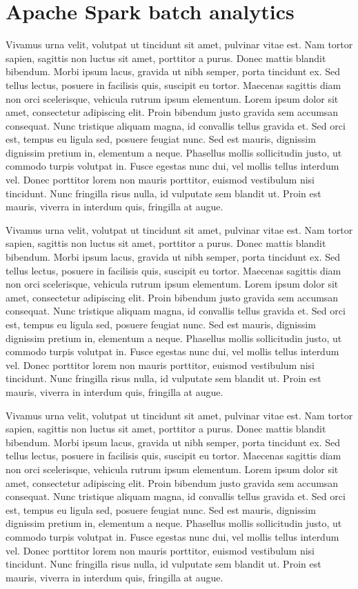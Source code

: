 \documentclass[a4paper, 10 pt, conference]{IEEEtran}
\begin{document}
\section{Apache Spark batch analytics}

Vivamus urna velit, volutpat ut tincidunt sit amet, pulvinar vitae est. Nam tortor sapien, sagittis non luctus sit amet, porttitor a purus. Donec mattis blandit bibendum. Morbi ipsum lacus, gravida ut nibh semper, porta tincidunt ex. Sed tellus lectus, posuere in facilisis quis, suscipit eu tortor. Maecenas sagittis diam non orci scelerisque, vehicula rutrum ipsum elementum. Lorem ipsum dolor sit amet, consectetur adipiscing elit. Proin bibendum justo gravida sem accumsan consequat. Nunc tristique aliquam magna, id convallis tellus gravida et. Sed orci est, tempus eu ligula sed, posuere feugiat nunc. Sed est mauris, dignissim dignissim pretium in, elementum a neque. Phasellus mollis sollicitudin justo, ut commodo turpis volutpat in. Fusce egestas nunc dui, vel mollis tellus interdum vel. Donec porttitor lorem non mauris porttitor, euismod vestibulum nisi tincidunt. Nunc fringilla risus nulla, id vulputate sem blandit ut. Proin est mauris, viverra in interdum quis, fringilla at augue.

Vivamus urna velit, volutpat ut tincidunt sit amet, pulvinar vitae est. Nam tortor sapien, sagittis non luctus sit amet, porttitor a purus. Donec mattis blandit bibendum. Morbi ipsum lacus, gravida ut nibh semper, porta tincidunt ex. Sed tellus lectus, posuere in facilisis quis, suscipit eu tortor. Maecenas sagittis diam non orci scelerisque, vehicula rutrum ipsum elementum. Lorem ipsum dolor sit amet, consectetur adipiscing elit. Proin bibendum justo gravida sem accumsan consequat. Nunc tristique aliquam magna, id convallis tellus gravida et. Sed orci est, tempus eu ligula sed, posuere feugiat nunc. Sed est mauris, dignissim dignissim pretium in, elementum a neque. Phasellus mollis sollicitudin justo, ut commodo turpis volutpat in. Fusce egestas nunc dui, vel mollis tellus interdum vel. Donec porttitor lorem non mauris porttitor, euismod vestibulum nisi tincidunt. Nunc fringilla risus nulla, id vulputate sem blandit ut. Proin est mauris, viverra in interdum quis, fringilla at augue.

Vivamus urna velit, volutpat ut tincidunt sit amet, pulvinar vitae est. Nam tortor sapien, sagittis non luctus sit amet, porttitor a purus. Donec mattis blandit bibendum. Morbi ipsum lacus, gravida ut nibh semper, porta tincidunt ex. Sed tellus lectus, posuere in facilisis quis, suscipit eu tortor. Maecenas sagittis diam non orci scelerisque, vehicula rutrum ipsum elementum. Lorem ipsum dolor sit amet, consectetur adipiscing elit. Proin bibendum justo gravida sem accumsan consequat. Nunc tristique aliquam magna, id convallis tellus gravida et. Sed orci est, tempus eu ligula sed, posuere feugiat nunc. Sed est mauris, dignissim dignissim pretium in, elementum a neque. Phasellus mollis sollicitudin justo, ut commodo turpis volutpat in. Fusce egestas nunc dui, vel mollis tellus interdum vel. Donec porttitor lorem non mauris porttitor, euismod vestibulum nisi tincidunt. Nunc fringilla risus nulla, id vulputate sem blandit ut. Proin est mauris, viverra in interdum quis, fringilla at augue.
\end{document}
